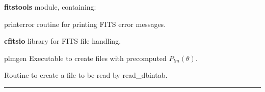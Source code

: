 \begin{modules}
  \begin{sulist}{} %
  \item[\textbf{fitstools}] module, containing:
  \item[printerror] routine for printing FITS error messages.
  \item[\textbf{cfitsio}] library for FITS file handling.		
  \end{sulist}
\end{modules}

\begin{related}
  \begin{sulist}{} %
  \item[plmgen] Executable to create files with precomputed $P_{lm}(\theta)$.
  \item[\htmlref{write\_plm}{sub:write_plm}] Routine to create a file to be read by read\_dbintab.
  \end{sulist}
\end{related}

\rule{\hsize}{2mm}

\newpage
